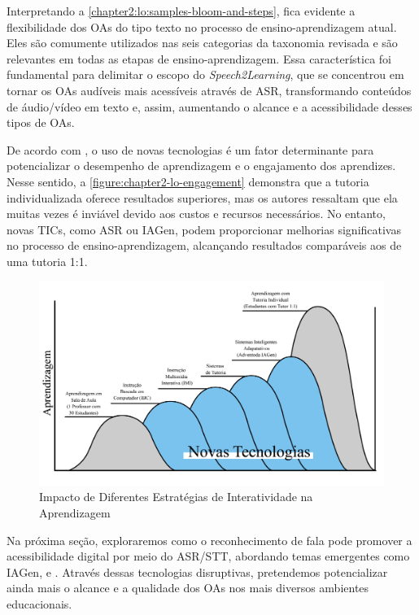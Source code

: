 Interpretando a \autoref{chapter2:lo:samples-bloom-and-steps}, fica evidente a flexibilidade dos OAs do tipo texto no processo de ensino-aprendizagem atual. Eles são comumente utilizados nas seis categorias da taxonomia revisada e são relevantes em todas as etapas de ensino-aprendizagem. Essa característica foi fundamental para delimitar o escopo do \textit{Speech2Learning}, que se concentrou em tornar os OAs audíveis mais acessíveis através de ASR, transformando conteúdos de áudio/vídeo em texto e, assim, aumentando o alcance e a acessibilidade desses tipos de OAs.

De acordo com , o uso de novas tecnologias é um fator determinante para potencializar o desempenho de aprendizagem e o engajamento dos aprendizes. Nesse sentido, a \autoref{figure:chapter2-lo-engagement} demonstra que a tutoria individualizada oferece resultados superiores, mas os autores ressaltam que ela muitas vezes é inviável devido aos custos e recursos necessários. No entanto, novas TICs, como ASR ou IAGen, podem proporcionar melhorias significativas no processo de ensino-aprendizagem, alcançando resultados comparáveis aos de uma tutoria 1:1.

\begin{figure}[htb]
\centering
\caption{Impacto de Diferentes Estratégias de Interatividade na Aprendizagem}
\label{figure:chapter2-lo-engagement}
\includegraphics[width=1\textwidth]{images/chapter2-lo-engagement.jpg}
\end{figure}

Na próxima seção, exploraremos como o reconhecimento de fala pode promover a acessibilidade digital por meio do ASR/STT, abordando temas emergentes como IAGen,  e . Através dessas tecnologias disruptivas, pretendemos potencializar ainda mais o alcance e a qualidade dos OAs nos mais diversos ambientes educacionais.

